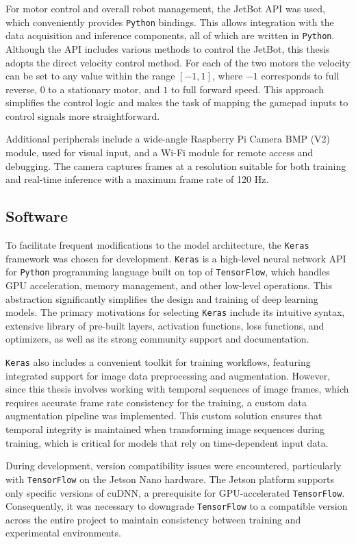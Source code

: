 For motor control and overall robot management, the JetBot API was used, which conveniently provides \texttt{Python} bindings. This allows integration with the data acquisition and inference components, all of which are written in \texttt{Python}. Although the API includes various methods to control the JetBot, this thesis adopts the direct velocity control method. For each of the two motors the velocity can be set to any value within the range \([-1, 1]\), where \(-1\) corresponds to full reverse, \(0\) to a stationary motor, and \(1\) to full forward speed. This approach simplifies the control logic and makes the task of mapping the gamepad inputs to control signals more straightforward.

Additional peripherals include a wide-angle Raspberry Pi Camera BMP (V2) module, used for visual input, and a Wi-Fi module for remote access and debugging. The camera captures frames at a resolution suitable for both training and real-time inference with a maximum frame rate of 120 Hz.

\subsection{Software}

To facilitate frequent modifications to the model architecture, the \texttt{Keras} framework was chosen for development. \texttt{Keras} is a high-level neural network API for \texttt{Python} programming language built on top of \texttt{TensorFlow}, which handles GPU acceleration, memory management, and other low-level operations. This abstraction significantly simplifies the design and training of deep learning models. The primary motivations for selecting \texttt{Keras} include its intuitive syntax, extensive library of pre-built layers, activation functions, loss functions, and optimizers, as well as its strong community support and documentation.

\texttt{Keras} also includes a convenient toolkit for training workflows, featuring integrated support for image data preprocessing and augmentation. However, since this thesis involves working with temporal sequences of image frames, which requires accurate frame rate consistency for the training, a custom data augmentation pipeline was implemented. This custom solution ensures that temporal integrity is maintained when transforming image sequences during training, which is critical for models that rely on time-dependent input data.

During development, version compatibility issues were encountered, particularly with \texttt{TensorFlow} on the Jetson Nano hardware. The Jetson platform supports only specific versions of cuDNN, a prerequisite for GPU-accelerated \texttt{TensorFlow}. Consequently, it was necessary to downgrade \texttt{TensorFlow} to a compatible version across the entire project to maintain consistency between training and experimental environments.

